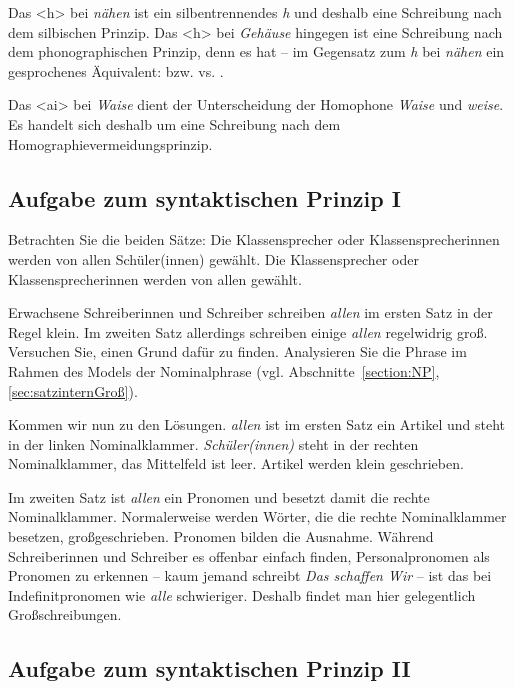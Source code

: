 Das <h> bei \textit{nähen} ist ein silbentrennendes \textit{h} und deshalb eine Schreibung nach dem silbischen Prinzip. Das <h> bei \textit{Gehäuse} hingegen ist eine Schreibung nach dem phonographischen Prinzip, denn es hat -- im Gegensatz zum \textit{h} bei \textit{nähen} ein gesprochenes Äquivalent: \textipa{[\textprimstress ne:@n]} bzw. \textipa{[\textprimstress nE:@n]} vs. .

 Das <ai> bei \textit{Waise} dient der Unterscheidung der Homophone \textit{Waise} und \textit{weise}. Es handelt sich deshalb um eine Schreibung nach dem Homographievermeidungsprinzip.


\subsection{Aufgabe zum syntaktischen Prinzip I}

Betrachten Sie die beiden Sätze: 
\ea
\ea Die Klassensprecher oder Klassensprecherinnen werden von allen Schüler(innen) gewählt. 
\ex Die Klassensprecher oder Klassensprecherinnen werden von allen gewählt.
\z
\z

Erwachsene Schreiberinnen und Schreiber schreiben \textit{allen} im ersten Satz in der Regel klein. Im zweiten Satz allerdings schreiben einige \textit{allen} regelwidrig  groß. Versuchen Sie, einen Grund dafür zu finden. Analysieren Sie die Phrase im Rahmen des Models der Nominalphrase (vgl. Abschnitte~\ref{section:NP}, \ref{sec:satzinternGroß}).

Kommen wir nun zu den Lösungen. \textit{allen} ist im ersten Satz ein Artikel und steht in der linken Nominalklammer. \textit{Schüler(innen)} steht in der rechten Nominalklammer, das Mittelfeld ist leer. Artikel werden klein geschrieben. 

Im zweiten Satz ist \textit{allen} ein Pronomen und besetzt damit die rechte Nominalklammer. Normalerweise werden Wörter, die die rechte Nominalklammer besetzen, großgeschrieben. Pronomen bilden die Ausnahme. Während Schreiberinnen und Schreiber es offenbar einfach finden, Personalpronomen als Pronomen zu erkennen -- kaum jemand schreibt \textit{Das schaffen Wir} -- ist das bei Indefinitpronomen wie \textit{alle} schwieriger. Deshalb findet man hier gelegentlich Großschreibungen.

\subsection{Aufgabe zum syntaktischen Prinzip II}

